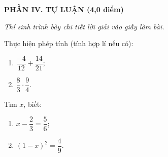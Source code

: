 \documentclass[12pt,a4paper]{article}
\begin{document}
\newpage
\setcounter{ex}{0}
\noindent\textbf{\large PHẦN IV. TỰ LUẬN (4,0 điểm)}

\textit{Thí sinh trình bày chi tiết lời giải vào giấy làm bài.}

\vspace{1mm}
\begin{ex}
Thực hiện phép tính (tính hợp lí nếu có):
\begin{enumerate}[label=\textbf{\alph*)}, leftmargin=0.8cm, itemsep=1pt]
\item $\dfrac{-4}{12} + \dfrac{14}{21}$;
\item $\dfrac{8}{3} \cdot \dfrac{9}{4}$.
\end{enumerate}
\end{ex}
\vspace{1.5mm}

\begin{ex}
Tìm $x$, biết:
\begin{enumerate}[label=\textbf{\alph*)}, leftmargin=0.8cm, itemsep=1pt]
\item $x - \dfrac{2}{3} = \dfrac{5}{6}$;
\item $(1 - x)^2 = \dfrac{4}{9}$.
\end{enumerate}
\end{ex}
\vspace{1.5mm}
\end{document}
